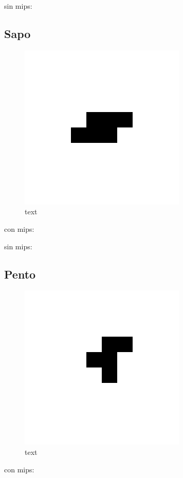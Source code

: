 sin mips:

\subsection{Sapo}

\begin{figure}[!htb]
	\centering
	\includegraphics[scale=0.5]{includes/gl_img/sapo001.png}
	\caption{text}
\end{figure}

con mips:

sin mips:

\subsection{Pento} 

\begin{figure}[!htb]
	\centering
	\includegraphics[scale=0.5]{includes/gl_img/pento001.png}
	\caption{text}
\end{figure}

con mips:

